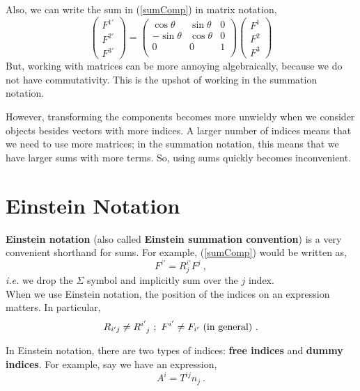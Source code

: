 \documentclass[11pt]{article}
\begin{document}
Also, we can write the sum in (\ref{sumComp}) in matrix notation,
\[
\begin{pmatrix}
F^{1'}\\
F^{2'}\\
F^{3'}
\end{pmatrix} = \begin{pmatrix}
\cos\theta& \sin\theta & 0\\
-\sin\theta & \cos\theta & 0\\
0 & 0 & 1\\
\end{pmatrix}\begin{pmatrix}
F^1\\
F^2\\
F^3
\end{pmatrix}
\]
But, working with matrices can be more annoying algebraically, because we do not have commutativity. This is the upshot of working in the summation notation.

However, transforming the components becomes more unwieldy when we consider objects besides vectors with more indices. A larger number of indices means that we need to use more matrices; in the summation notation, this means that we have larger sums with more terms. So, using sums quickly becomes inconvenient.

\section{Einstein Notation}

\textbf{Einstein notation} (also called \textbf{Einstein summation convention}) is a very convenient shorthand for sums. For example, (\ref{sumComp}) would be written as,
\begin{equation}
F^{i'} = R^{i'}_{j} F^j\ ,
\end{equation}
\textit{i.e.} we drop the $\Sigma$ symbol and implicitly sum over the $j$ index.\\

When we use Einstein notation, the position of the indices on an expression matters. In particular,
\begin{equation}
R_{i'j} \neq \tensor{R}{^{i'}_j}\ ;\ F^{i'} \neq F_{i'}\ (\text{in general})\ .
\end{equation}

In Einstein notation, there are two types of indices: \textbf{free indices} and \textbf{dummy indices}. For example, say we have an expression,
\begin{equation}
A^i = T^{ij} n_j\ .
\end{equation}
\end{document}
